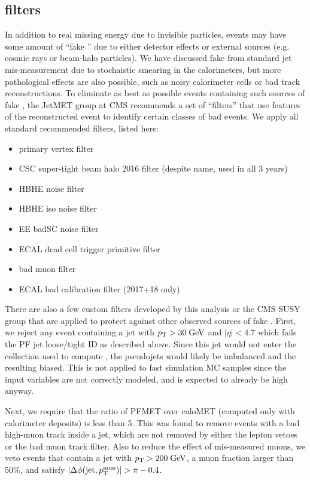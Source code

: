\subsection{\ptmiss filters}
\label{sec:metfilters}
In addition to real missing energy due to invisible particles, events may have some amount of ``fake \ptmiss'' due to either
detector effects or external sources (e.g. cosmic rays or beam-halo particles). We have discussed fake \ptmiss from 
standard jet mis-measurement due to stochaistic smearing in the calorimeters, but more pathological effects are also possible,
such as noisy calorimeter cells or bad track reconstructions. To eliminate as best as possible events containing such sources
of fake \ptmiss, the JetMET group at CMS recommends a set of ``\ptmiss filters'' that use features of the reconstructed
event to identify certain classes of bad events. We apply all standard recommended filters, listed here:
\begin{itemize}\setlength\itemsep{-1mm}
\item primary vertex filter
\item CSC super-tight beam halo 2016 filter (despite name, used in all 3 years)
\item HBHE noise filter
\item HBHE iso noise filter
\item EE badSC noise filter
\item ECAL dead cell trigger primitive filter
\item bad muon filter
\item ECAL bad calibration filter (2017+18 only)
\end{itemize}

There are also a few custom \ptmiss filters developed by this analysis or the CMS SUSY group that are applied to protect 
against other observed sources of fake \ptmiss.
First, we reject any event containing a jet with $p_{\mathrm{T}}>30\;\text{Ge\hspace{-.08em}V}$ and $|\eta|<4.7$ which fails the PF jet loose/tight ID as described above.
Since this jet would not enter the collection used to compute \mttwo, the pseudojets would likely be imbalanced and the resulting
\mttwo biased.
This is not applied to fast simulation MC samples since the input variables are not correctly modeled, and \mttwo
is expected to already be high anyway.

Next, we require that the ratio of PFMET over caloMET (\ptmiss computed only with calorimeter deposits) is less than 5.
This was found to remove events with a bad high-\pt muon track inside a jet, which are not removed by either the lepton
vetoes or the bad muon track filter. 
Also to reduce the effect of mis-measured muons, we veto events that contain a jet with $p_{\mathrm{T}}>200\;\text{Ge\hspace{-.08em}V}$, a muon fraction
larger than 50\%, and satisfy $|\Delta\phi(\mathrm{jet},p_{\mathrm{T}}^{\mathrm{miss}})| > \pi-0.4$.

